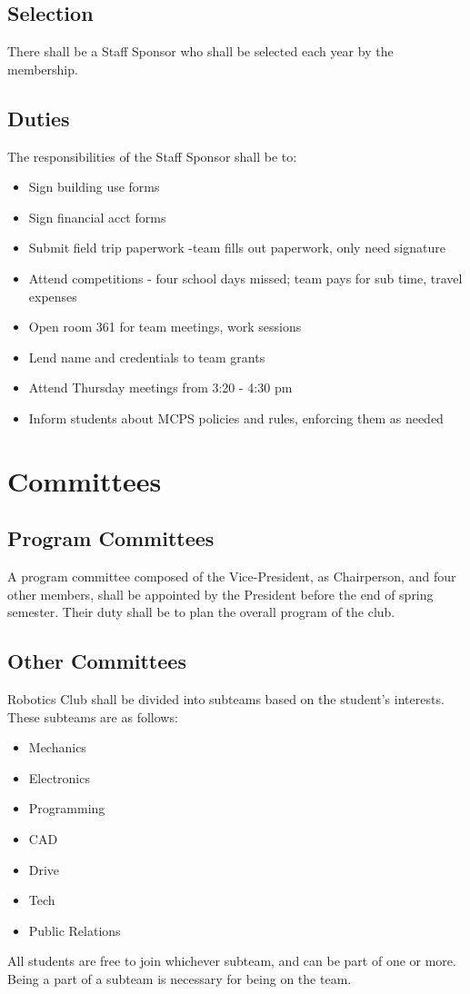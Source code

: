 \documentclass[12pt, a4paper]{article}
\begin{document}
\subsection{Selection}
There shall be a Staff Sponsor who shall be selected each year by the membership.
\subsection{Duties}
The responsibilities of the Staff Sponsor shall be to:
\begin{itemize}
\item Sign building use forms
\item Sign financial acct forms
\item Submit field trip paperwork -team fills out paperwork, only need signature
\item Attend competitions - four school days missed; team pays for sub time, travel expenses
\item Open room 361 for team meetings, work sessions
\item Lend name and credentials to team grants
\item Attend Thursday meetings from 3:20 - 4:30 pm
\item Inform students about MCPS policies and rules, enforcing them as needed
\end{itemize}
\section{Committees}
\subsection{Program Committees}
A program committee composed of the Vice-President, as Chairperson, and four other members, shall be appointed by the President before the end of spring semester. Their duty shall be to plan the overall program of the club.
\subsection{Other Committees}
Robotics Club shall be divided into subteams based on the student’s interests. These subteams are as follows:
\begin{itemize}
\item Mechanics
\item Electronics
\item Programming
\item CAD
\item Drive
\item Tech
\item Public Relations
\end{itemize}
All students are free to join whichever subteam, and can be part of one or more. Being a part of a subteam is necessary for being on the team.
\end{document}
